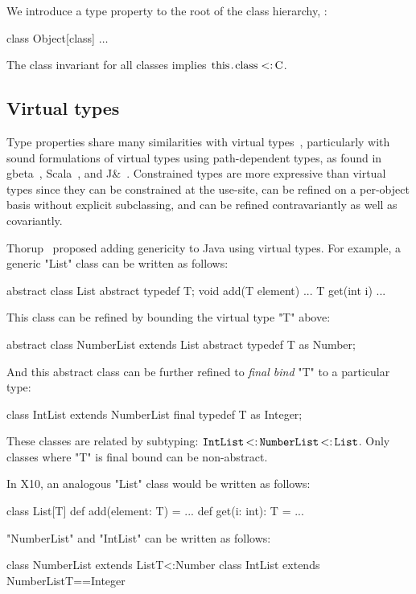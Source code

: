 \documentclass[preprint,nocopyrightspace,9pt]{sigplanconf}
\begin{document}
We introduce a 
type property  to the root of the class hierarchy, :
\begin{xtenmath}
class Object[class] { $\dots$ }
\end{xtenmath}

The class invariant for all classes 
implies $\Xcd{this}.\Xcd{class} \subtype \Xcd{C}$.

\subsection{Virtual types}

Type properties share many similarities with virtual types~\cite{mp89-virtual-classes,beta}, particularly
with sound formulations of virtual types using path-dependent types,
as found in gbeta~\cite{ernst99-gbeta}, Scala~\cite{scala},
and J\&~\cite{nqm06}.
%
Constrained types are more expressive than virtual
types since they can be constrained at the use-site,
can be refined on a per-object basis without explicit subclassing,
and can be refined contravariantly
as well as covariantly.

Thorup~\cite{thorup97}
proposed adding genericity to Java using virtual types.  For example,
a generic \xcd"List" class can be written as follows:
\begin{xten}
abstract class List {
    abstract typedef T;
    void add(T element) { ... }
    T get(int i) { ... }
}
\end{xten}
This class can be refined by bounding the virtual type \xcd"T" above:
\begin{xten}
abstract class NumberList extends List {
    abstract typedef T as Number;
}
\end{xten}
And this abstract class can be further refined to \emph{final bind}
\xcd"T" to a particular type:
\begin{xten}
class IntList extends NumberList {
    final typedef T as Integer;
}
\end{xten}
These classes are related by subtyping:
${\tt IntList} \subtype {\tt NumberList} \subtype {\tt List}$.
Only classes where \xcd"T" is final bound can be non-abstract.

In X10, an analogous \xcd"List" class would be written as follows:
\begin{xten}
class List[T] {
    def add(element: T) = { ... }
    def get(i: int): T = { ... }
}
\end{xten}

\xcd"NumberList" and \xcd"IntList" can be written as follows:
\begin{xten}
class NumberList extends List{T<:Number} { }
class IntList extends NumberList{T==Integer} { }
\end{xten}
\end{document}

